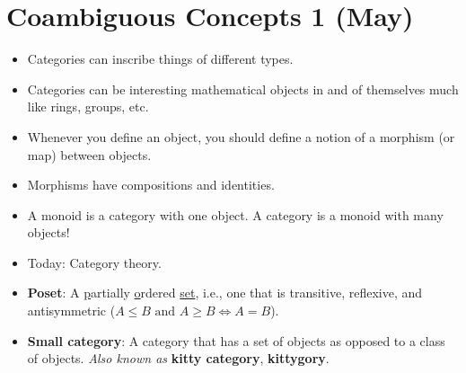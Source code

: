 \documentclass[../main.tex]{subfiles}
\begin{document}
\section{Coambiguous Concepts 1 (May)}
\begin{itemize}
    \item Categories can inscribe things of different types.
    \item Categories can be interesting mathematical objects in and of themselves much like rings, groups, etc.
    \item Whenever you define an object, you should define a notion of a morphism (or map) between objects.
    \item Morphisms have compositions and identities.
    \item A monoid is a category with one object. A category is a monoid with many objects!
    \item Today: Category theory.
    \item \textbf{Poset}: A \underline{p}artially \underline{o}rdered \underline{set}, i.e., one that is transitive, reflexive, and antisymmetric ($A\leq B\text{ and }A\geq B\Longleftrightarrow A=B$).
    \item \textbf{Small category}: A category that has a set of objects as opposed to a class of objects. \emph{Also known as} \textbf{kitty category}, \textbf{kittygory}.
\end{itemize}
\end{document}
